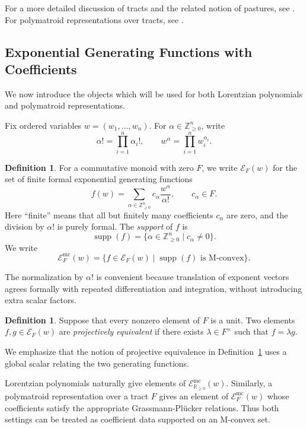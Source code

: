\documentclass[11pt]{article}
\theoremstyle{definition}
\newtheorem{definition}[theorem]{Definition}
\theoremstyle{remark}
\newcommand{\Zgeqn}{\mathbb{Z}_{\geq 0}^n}     %
\newcommand{\R}{\mathbb{R}}
\DeclareMathOperator{\supp}{supp}
\begin{document}
For a more detailed discussion of tracts and the related notion of pastures, see \cite{baker2020foundationsmatroidsimatroids}. For polymatroid representations over tracts, see \cite{baker2025representationtheorypolymatroids}.

\subsection{Exponential Generating Functions with Coefficients}

We now introduce the objects which will be used for both Lorentzian polynomials and polymatroid representations.

Fix ordered variables $w=(w_1,\dots,w_n)$. For $\alpha\in\Zgeqn$, write
\[
    \alpha! = \prod_{i=1}^n \alpha_i!,
    \qquad
    w^\alpha = \prod_{i=1}^n w_i^{\alpha_i}.
\]

\begin{definition}
    For a commutative monoid with zero $F$, we write $\mathcal{E}_F(w)$ for the set of finite formal exponential generating functions
    \[
        f(w)=\sum_{\alpha\in\Zgeqn} c_\alpha \frac{w^\alpha}{\alpha!},
        \qquad c_\alpha\in F.
    \]
    Here ``finite'' means that all but finitely many coefficients $c_\alpha$ are zero, and the division by $\alpha!$ is purely formal. The \emph{support} of $f$ is
    \[
        \supp(f)=\{\alpha\in\Zgeqn \mid c_\alpha\neq 0\}.
    \]
    We write
    \[
        \mathcal{E}^{\mathrm{mc}}_F(w)
        =
        \{f\in\mathcal{E}_F(w) \mid \supp(f) \text{ is M-convex}\}.
    \]
\end{definition}

The normalization by $\alpha!$ is convenient because translation of exponent vectors agrees formally with repeated differentiation and integration, without introducing extra scalar factors.

\begin{definition} \label{def:projective_equivalence}
    Suppose that every nonzero element of $F$ is a unit. Two elements $f,g\in\mathcal{E}_F(w)$ are \emph{projectively equivalent} if there exists $\lambda\in F^\times$ such that $f=\lambda g$.
\end{definition}

We emphasize that the notion of projective equivalence in Definition~\ref{def:projective_equivalence} uses a global scalar relating the two generating functions.

Lorentzian polynomials naturally give elements of $\mathcal{E}^{\mathrm{mc}}_{\R_{\geq 0}}(w)$. Similarly, a polymatroid representation over a tract $F$ gives an element of $\mathcal{E}^{\mathrm{mc}}_F(w)$ whose coefficients satisfy the appropriate Grassmann-Pl\"ucker relations. Thus both settings can be treated as coefficient data supported on an M-convex set.
\end{document}
